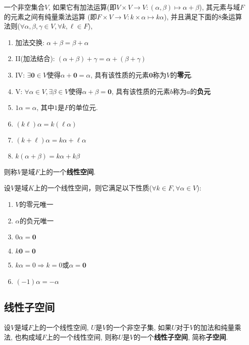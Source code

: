 \begin{Definition}[线性空间]
一个非空集合$V$, 如果它有加法运算(即$V \times V \rightarrow V: (\alpha, \beta) \mapsto \alpha + \beta$), 其元素与域$F$的元素之间有纯量乘法运算
(即$F \times V \rightarrow V: k \times \alpha \mapsto k \alpha$), 并且满足下面的$8$条运算法则($\forall \alpha, \beta, \gamma \in V, 
\forall k, \ell \in F$),
\begin{enumerate}[(1)]
	\item 加法交换: $\alpha + \beta = \beta + \alpha$
	\item II(加法结合): $(\alpha + \beta) + \gamma = \alpha + (\beta + \gamma)$
	\item IV: $\exists \mathbf{0} \in V$使得$\alpha + \mathbf{0} = \alpha$, 具有该性质的元素$\mathbf{0}$称为$V$的\textbf{零元}.
	\item V: $\forall \alpha \in V, \exists \beta \in V$使得$\alpha + \beta = \mathbf{0}$, 具有该性质的元素$b$称为$a$的\textbf{负元}
	\item $\mathfrak{1} \alpha = \alpha$, 其中$\mathfrak{1}$是$F$的单位元.
	\item $(k \ell) \alpha = k (\ell \alpha)$
	\item $(k+\ell) \alpha = k \alpha + \ell \alpha$
	\item $k(\alpha + \beta) = k \alpha + k\beta$
\end{enumerate}
则称$V$是域$F$上的一个\textbf{线性空间}.
\end{Definition}

\begin{Property}
设$V$是域$K$上的一个线性空间，则它满足以下性质($\forall k \in F, \forall \alpha \in V$):
\begin{enumerate}[(1)]
\item $V$的零元唯一
\item $\alpha$的负元唯一
\item $0 \alpha = \mathbf{0}$
\item $k \mathbf{0} = \mathbf{0}$
\item $k \alpha = 0 \Rightarrow k = 0$或$\alpha = \mathbf{0}$
\item $(-1) \alpha = - \alpha$
\end{enumerate}
\end{Property}

\subsection{线性子空间}

\begin{Definition}[线性子空间]
设$V$是域$F$上的一个线性空间, $U$是$V$的一个非空子集, 如果$U$对于$V$的加法和纯量乘法, 也构成域$F$上的一个线性空间, 则称$U$是$V$的一个\textbf{线性子空间}, 简称\textbf{子空间}.
\end{Definition}

